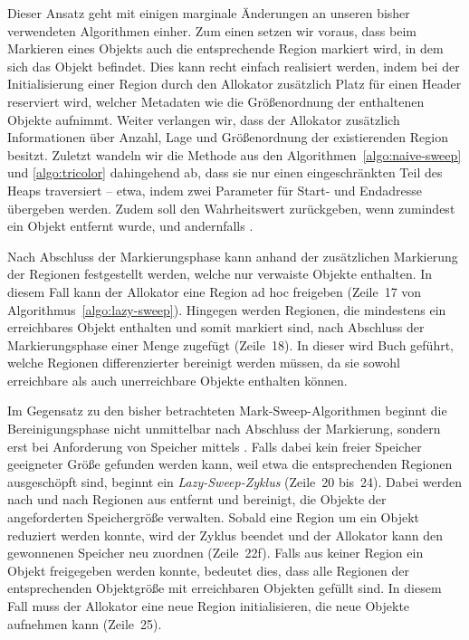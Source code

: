 Dieser Ansatz geht mit einigen marginale Änderungen an unseren bisher verwendeten Algorithmen einher.
Zum einen setzen wir voraus, dass beim Markieren eines Objekts auch die entsprechende Region markiert wird, in dem sich das Objekt befindet.
Dies kann recht einfach realisiert werden, indem bei der Initialisierung einer Region durch den Allokator zusätzlich Platz für einen Header reserviert wird, welcher Metadaten wie die Größenordnung der enthaltenen Objekte aufnimmt.
Weiter verlangen wir, dass der Allokator zusätzlich Informationen über Anzahl, Lage und Größenordnung der existierenden Region besitzt.
Zuletzt wandeln wir die Methode  aus den Algorithmen~\ref{algo:naive-sweep} und \ref{algo:tricolor} dahingehend ab, dass sie nur einen eingeschränkten Teil des Heaps traversiert -- etwa, indem zwei Parameter für Start- und Endadresse übergeben werden.
Zudem soll  den Wahrheitswert  zurückgeben, wenn zumindest ein Objekt entfernt wurde, und andernfalls .

Nach Abschluss der Markierungsphase kann anhand der zusätzlichen Markierung der Regionen festgestellt werden, welche nur verwaiste Objekte enthalten.
In diesem Fall kann der Allokator eine Region ad hoc freigeben (Zeile~17 von Algorithmus~\ref{algo:lazy-sweep}).
Hingegen werden Regionen, die mindestens ein erreichbares Objekt enthalten und somit markiert sind, nach Abschluss der Markierungsphase einer Menge  zugefügt (Zeile~18).
In dieser wird Buch geführt, welche Regionen differenzierter bereinigt werden müssen, da sie sowohl erreichbare als auch unerreichbare Objekte enthalten können.

Im Gegensatz zu den bisher betrachteten Mark-Sweep-Algorithmen beginnt die Bereinigungsphase nicht unmittelbar nach Abschluss der Markierung, sondern erst bei Anforderung von Speicher mittels .
Falls dabei kein freier Speicher geeigneter Größe gefunden werden kann, weil etwa die entsprechenden Regionen ausgeschöpft sind, beginnt ein \textit{Lazy-Sweep-Zyklus} (Zeile~20 bis~24).
Dabei werden nach und nach Regionen aus  entfernt und bereinigt, die Objekte der angeforderten Speichergröße verwalten.
Sobald eine Region um ein Objekt reduziert werden konnte, wird der Zyklus beendet und der Allokator kann den gewonnenen Speicher neu zuordnen (Zeile~22f).
Falls aus keiner Region ein Objekt freigegeben werden konnte, bedeutet dies, dass alle Regionen der entsprechenden Objektgröße mit erreichbaren Objekten gefüllt sind.
In diesem Fall muss der Allokator eine neue Region initialisieren, die neue Objekte aufnehmen kann (Zeile~25).

